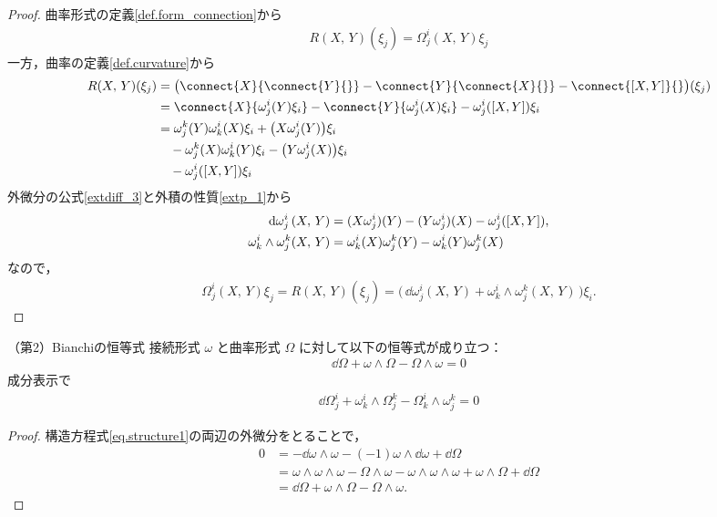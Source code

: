\documentclass[geometry_main]{subfiles}
\begin{document}
\begin{proof} 
	曲率形式の定義\ref{def.form_connection}から
	\begin{align} 
		R(X,\, Y)(\xi_j) = \Omega^i_j(X,\, Y) \xi_j
	\end{align}
	一方，曲率の定義\ref{def.curvature}から
	\begin{align} 
		R(X,\, Y)(\xi_j) &= \bigl( \connect{X}{\connect{Y}{}} - \connect{Y}{\connect{X}{}} - \connect{\comm{X}{Y}}{}\bigr)(\xi_j) \\
		&= \connect{X}{\omega^i_j(Y) \xi_i} - \connect{Y}{\omega^i_j(X) \xi_i} - \omega^i_j(\comm{X}{Y}) \xi_i \\
		&= \omega^k_j(Y) \omega^i_k(X)\xi_i + \bigl( X\omega^i_j(Y) \bigr) \xi_i \\
		&\quad - \omega^k_j(X) \omega^i_k(Y)\xi_i - \bigl( Y\omega^i_j(X) \bigr) \xi_i \\
		&\quad - \omega^i_j(\comm{X}{Y}) \xi_i
	\end{align}
	外微分の公式\ref{extdiff_3}と外積の性質\ref{extp_1}から
	\begin{align} 
		\dd{\omega^i_j}(X,\, Y) &= (X\omega^i_j)(Y) - (Y\omega^i_j)(X) - \omega^i_j(\comm{X}{Y}), \\
		\omega^i_k \wedge \omega^k_j (X,\, Y) &= \omega^i_k(X) \omega^k_j(Y) - \omega^i_k(Y) \omega^k_j(X)
	\end{align}
	なので，
	\begin{align} 
		\Omega^i_j(X,\, Y) \xi_j = R(X,\, Y)(\xi_j) = \bigl(\, \dd{\omega^i_j}(X,\, Y) + \omega^i_k \wedge \omega^k_j (X,\, Y) \, \bigr) \xi_i.
	\end{align}
\end{proof}

\begin{mycol}[label=Bianchi2]{（第2）Bianchiの恒等式}
	接続形式 $\omega$ と曲率形式 $\Omega$ に対して以下の恒等式が成り立つ：
	\begin{align} 
		\dd{\Omega} + \omega \wedge \Omega - \Omega \wedge \omega = 0
	\end{align}
	成分表示で
	\begin{align} 
		\dd{\Omega^i_j} + \omega^i_k \wedge \Omega^k_j - \Omega^i_k \wedge \omega^k_j = 0
	\end{align}
\end{mycol}

\begin{proof} 
	構造方程式\ref{eq.structure1}の両辺の外微分をとることで，
	\begin{align} 
		0 &= - \dd{\omega} \wedge \omega - (-1) \omega \wedge \dd{\omega} + \dd{\Omega} \\
		&= \omega \wedge \omega \wedge \omega - \Omega \wedge \omega - \omega \wedge \omega \wedge \omega + \omega \wedge \Omega + \dd{\Omega} \\
		&= \dd{\Omega} + \omega \wedge \Omega - \Omega \wedge \omega.
	\end{align}
\end{proof}
\end{document}
